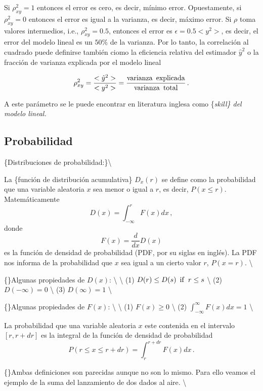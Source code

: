 \documentclass[
]{agujournal2019}
\begin{document}
Si \(\rho^2_{xy}=1\) entonces el error es cero, es decir, mínimo error.
Opuestamente, si \(\rho^2_{xy}=0\) entonces el error es igual a la
varianza, es decir, máximo error. Si \(\rho\) toma valores intermedios,
i.e., \(\rho^2_{xy}=0.5\), entonces el error es \(\epsilon=0.5<y^2>\),
es decir, el error del modelo lineal es un \(50\%\) de la varianza. Por
lo tanto, la correlación al cuadrado puede definirse también ciomo la
eficiencia relativa del estimador \(\hat{y}^2\) o la fracción de
varianza explicada por el modelo lineal

\[\rho^2_{xy}=\frac{<\hat{y}^2>}{<y^2>}=\frac{{\rm varianza\,\,\,explicada}}{{\rm varianza\,\,\,total}}\,.\]

A este parámetro se le puede encontrar en literatura inglesa como
\{\it skill\} del modelo lineal.

\subsection{Probabilidad}

\vspace{0.5cm}

\{\noindent  Distribuciones de probabilidad:\}\textbackslash{}

La \{función de distribución acumulativa\} \(D_x(r)\) se define como la
probabilidad que una variable aleatoria \(x\) sea menor o igual a \(r\),
es decir, \(P(x\le r)\). Matemáticamente
\[D(x)=\int^r_{-\infty}F(x)dx\,,\] donde \[F(x)=\frac{d}{dx} D(x)\] es
la función de densidad de probabilidad (PDF, por su siglas en inglés).
La PDF nos informa de la probabilidad que \(x\) sea igual a un cierto
valor \(r\), \(P(x=r)\). \textbackslash{}

\{\noindent\}Algunas propiedades de \(D(x)\): \textbackslash{}
\textbackslash{} (1) \(D(r)\le D(s)\,\,\,{\rm if}\,\,\,r\le s\)
\textbackslash{} (2) \(D(-\infty)=0\) \textbackslash{} (3)
\(D(\infty)=1\) \textbackslash{}

\{\noindent\}Algunas propiedades de \(F(x)\): \textbackslash{}
\textbackslash{} (1) \(F(x)\ge0\) \textbackslash{} (2)
\(\int^{\infty}_{-\infty} F(x) dx=1\) \textbackslash{}

La probabilidad que una variable aleatoria \(x\) este contenida en el
intervalo \([r,r+dr]\) es la integral de la función de densidad de
probabilidad \[P(r\le x\le r+dr)=\int^{r+dr}_r F(x)dx\,.\]

\{\noindent\}Ambas definiciones son parecidas aunque no son lo mismo.
Para ello veamos el ejemplo de la suma del lanzamiento de dos dados al
aire. \textbackslash{}
\end{document}
